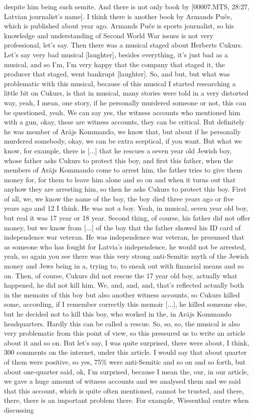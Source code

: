 despite him being such semite. And there is not only book by [00007.MTS, 28:27, Latvian journalist’s name]. I think there is another book by Armands Puče, which is published about year ago. Armands Puče is sports journalist, so his knowledge and understanding of Second World War issues is not very professional, let’s say. Then there was a musical staged about Herberts Cukurs. Let’s say very bad musical [laughter], besides everything, it’s just bad as a musical, and so I’m, I’m very happy that the company that staged it, the producer that staged, went bankrupt [laughter]. So, and but, but what was problematic with this musical, because of this musical I started researching a little bit on Cukurs, is that in musical, many stories were told in a very distorted way, yeah, I mean, one story, if he personally murdered someone or not, this can be questioned, yeah. We can say yes, the witness accounts who mentioned him with a gun, okay, these are witness accounts, they can be critical. But definitely he was member of Arājs Kommando, we know that, but about if he personally murdered somebody, okay, we can be extra sceptical, if you want. But what we know, for example, there is [...] that he rescues a seven year old Jewish boy, whose father asks Cukurs to protect this boy, and first this father, when the members of Arājs Kommando come to arrest him, the father tries to give them money for, for them to leave him alone and so on and when it turns out that anyhow they are arresting him, so then he asks Cukurs to protect this boy. First of all, we, we know the name of the boy, the boy died three years ago or five years ago and 12 I think. He was not a boy. Yeah, in musical, seven year old boy, but real it was 17 year or 18 year. Second thing, of course, his father did not offer money, but we know from [...] of the boy that the father showed his ID card of independence war veteran. He was independence war veteran, he presumed that as someone who has fought for Latvia's independence, he would not be arrested, yeah, so again you see there was this very strong anti-Semitic myth of the Jewish money and Jews being in a, trying to, to sneak out with financial means and so on. Then, of course, Cukurs did not rescue the 17 year old boy, actually what happened, he did not kill him. We, and, and, and, that’s reflected actually both in the memoirs of this boy but also another witness accounts, so Cukurs killed some, according, if I remember correctly this memoir [...], he killed someone else, but he decided not to kill this boy, who worked in the, in Arājs Kommando headquarters. Hardly this can be called a rescue. So, so, so, the musical is also very problematic from this point of view, so this pressured us to write an article about it and so on. But let's say, I was quite surprised, there were about, I think, 300 comments on the internet, under this article. I would say that about quarter of them were positive, so yes, 75\% were anti-Semitic and so on and so forth, but about one-quarter said, ok, I'm surprised, because I mean the, our, in our article, we gave a huge amount of witness accounts and we analysed them and we said that this account, which is quite often mentioned, cannot be trusted, and there, there, there is an important problem there. For example, Wiesenthal centre when discussing 